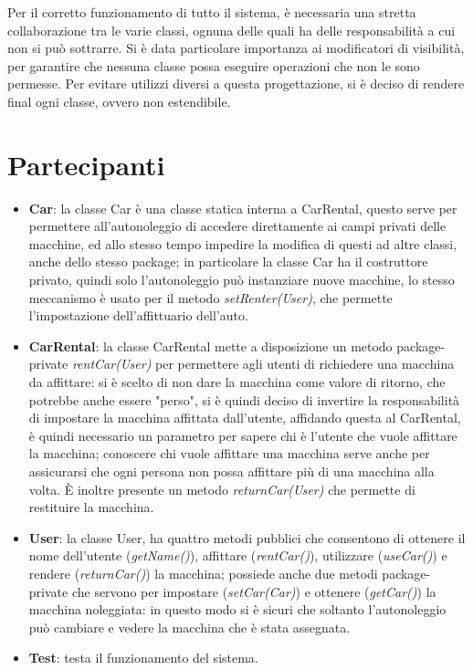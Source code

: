 \documentclass[]{article}
\begin{document}
Per il corretto funzionamento di tutto il sistema, è necessaria una stretta collaborazione tra le varie classi, ognuna delle quali ha delle responsabilità a cui non si può sottrarre.
Si è data particolare importanza ai modificatori di visibilità, per garantire che nessuna classe possa eseguire operazioni che non le sono permesse.
Per evitare utilizzi diversi a questa progettazione, si è deciso di rendere final ogni classe, ovvero non estendibile.


\section*{Partecipanti}
\begin{itemize}
\item \textbf{Car}: la classe Car è una classe statica interna a CarRental, questo serve per permettere all'autonoleggio di accedere direttamente ai campi privati delle macchine, ed allo stesso tempo impedire la modifica di questi ad altre classi, anche dello stesso package; in particolare la classe Car ha il costruttore privato, quindi solo l'autonoleggio può instanziare nuove macchine, lo stesso meccanismo è usato per il metodo \textit{setRenter(User)}, che permette l'impostazione dell'affittuario dell'auto.
\item \textbf{CarRental}: la classe CarRental mette a disposizione un metodo package-private \textit{rentCar(User)} per permettere agli utenti di richiedere una macchina da affittare: si è scelto di non dare la macchina come valore di ritorno, che potrebbe anche essere "perso", si è quindi deciso di invertire la responsabilità di impostare la macchina affittata dall'utente, affidando questa al CarRental, è quindi necessario un parametro per sapere chi è l'utente che vuole affittare la macchina; conoscere chi vuole affittare una macchina serve anche per assicurarsi che ogni persona non possa affittare più di una macchina alla volta. È inoltre presente un metodo \textit{returnCar(User)} che permette di restituire la macchina.

\item \textbf{User}: la classe User, ha quattro metodi pubblici che consentono di ottenere il nome dell'utente (\textit{getName()}), affittare (\textit{rentCar()}), utilizzare (\textit{useCar()}) e rendere (\textit{returnCar()}) la macchina; possiede anche due metodi package-private che servono per impostare (\textit{setCar(Car)}) e ottenere (\textit{getCar()}) la macchina noleggiata: in questo modo si è sicuri che soltanto l'autonoleggio può cambiare e vedere la macchina che è stata assegnata.
\item \textbf{Test}: testa il funzionamento del sistema.
\end{itemize}
\end{document}
